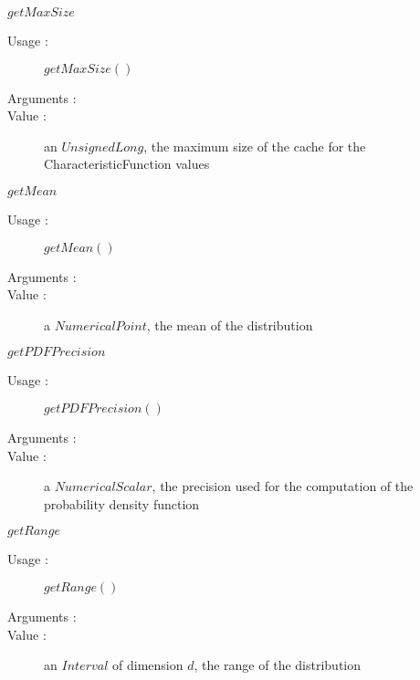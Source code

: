 \begin{description}
\begin{description}
  \item $getMaxSize$
    \begin{description}
    \item[Usage :]  $getMaxSize()$
    \item[Arguments :]  \strut
    \item[Value :] an $UnsignedLong$, the maximum size of the cache for the CharacteristicFunction values
    \end{description}

  \item $getMean$
    \begin{description}
    \item[Usage :]  $getMean()$
    \item[Arguments :]  \strut
    \item[Value :] a $NumericalPoint$, the mean of the distribution
    \end{description}

  \item $getPDFPrecision$
    \begin{description}
    \item[Usage :]  $getPDFPrecision()$
    \item[Arguments :]  \strut
    \item[Value :] a $NumericalScalar$, the precision used for the computation of the probability density function
    \end{description}

  \item $getRange$
    \begin{description}
    \item[Usage :]  $getRange()$
    \item[Arguments :]  \strut
    \item[Value :] an $Interval$ of dimension $d$, the range of the distribution
    \end{description}


\end{description}
\end{description}

